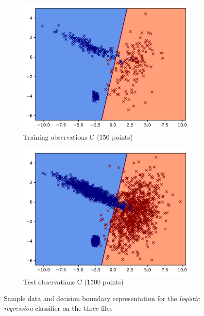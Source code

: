 \documentclass[a4paper, 11pt]{article}
\newcommand{\name}[1]{\emph{#1}}
\begin{document}
\begin{figure}[p]
\begin{subfigure}[t]{0.40\textwidth}
    \includegraphics[width=\textwidth]{LogReg_classificationC_train.pdf}
    \caption{Training observations C ($150$ points)}\label{fig:LogReg-C-train}
  \end{subfigure}
  \quad
  \begin{subfigure}[t]{0.40\textwidth}
    \centering
    \includegraphics[width=\textwidth]{LogReg_classificationC_test.pdf}
    \caption{Test observations C ($1500$ points)}\label{fig:LogReg-C-test}
  \end{subfigure}
  \caption{Sample data and decision boundary representation for the \name{logistic regression} classifier on the three files}\label{fig:LogReg}
\end{figure}
\end{document}
